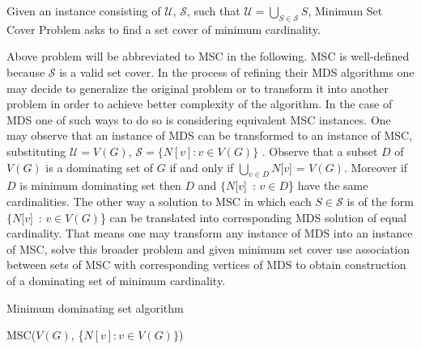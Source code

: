 \begin{definition}
Given an instance consisting of $\mathcal{U}$, $\mathcal{S}$, such that $\mathcal{U} = \bigcup_{S\in\mathcal{S}} S$, Minimum Set Cover Problem asks to find a set cover of minimum cardinality.
\end{definition}
Above problem will be abbreviated to MSC in the following. MSC is well-defined because $\mathcal{S}$ is a valid set cover. In the process of refining their MDS algorithms one may decide to generalize the original problem or to transform it into another problem in order to achieve better complexity of the algorithm. In the case of MDS one of such ways to do so is considering equivalent MSC instances. One may observe that an instance of MDS can be transformed to an instance of MSC, substituting $\mathcal{U} = V(G)$, $\mathcal{S} = \{N[v] : v\in V(G)\}$ \cite{VANROOIJ20112147}. Observe that a subset $D$ of $V(G)$ is a dominating set of $G$ if and only if $\bigcup_{v\in D} N$[$v$] = $V(G)$. Moreover if $D$ is minimum dominating set then $D$ and $\{N$[$v$]\ : $v\in D$\} have the same cardinalities. The other way a solution to MSC in which each $S\in \mathcal{S}$ is of the form $\{N$[$v$]\ : $v\in V(G)$\} can be translated into corresponding MDS solution of equal cardinality. That means one may transform any instance of MDS into an instance of MSC, solve this broader problem and given minimum set cover use association between sets of MSC with corresponding vertices of MDS to obtain construction of a dominating set of minimum cardinality.
\begin{algorithm}
\caption{Minimum dominating set algorithm}\label{alg:mds_to_msc}
\begin{algorithmic}[1]
\State MSC($V(G)$, \{$N[v] : v\in V(G)\}$)
\EndProcedure
\end{algorithmic}
\end{algorithm}

